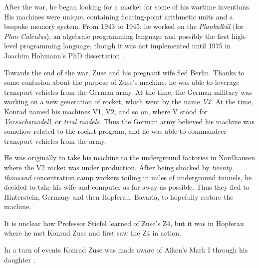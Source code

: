 After the war, he began looking for a market for some of his wartime inventions.
His machines were unique, containing floating-point arithmetic units and a
bespoke memory system.
From 1943 to 1945, he worked on the \textit{Plankalkül} (for \textit{Plan Calculus}),
an algebraic programming language and possibly the first high-level programming language,
though it was not implemented until 1975 in Joachim Hohmann's PhD dissertation
.

Towards the end of the war, Zuse and his pregnant wife fled Berlin.
Thanks to some confusion about the purpose of Zuse's machine, he was able to leverage
transport vehicles from the German army.
At the time, the German military was working on a new generation of rocket, which
went by the name \textit{V2}. At the time, Konrad named his machines V1, V2, and so on,
where V stood for \textit{Versuchsmodell}, or \textit{trial models}.
Thus the German army believed his machine was somehow related to the rocket program,
and he was able to commandeer transport vehicles from the army.

He was originally to take his machine to the underground factories in Nordhausen
where the V2 rocket was under production. After being shocked by \textit{twenty thousand}
concentration camp workers toiling in miles of underground tunnels, he
decided to take his wife and computer as far away as possible.
Thus they fled to Hinterstein, Germany and then Hopferau, Bavaria, to
hopefully restore the machine.

It is unclear how Professor Stiefel learned of Zuse's Z4, but it was in Hopferau
where he met Konrad Zuse and first saw the Z4 in action.

\iffalse
	In a turn of events Konrad Zuse was made
	aware of Aiken's Mark I through his daughter
	\cite{howard_aiken_and_the_dawn_of_the_computer_age_2000}:

